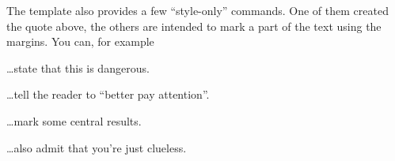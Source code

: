 
The template also provides a few ``style-only'' commands. One of them created the quote above, the others are intended to mark a part of the text using the margins. You can, for example

\bigskip\bigskip
\dots state that this is dangerous.\MDanger

\bigskip\bigskip
\dots tell the reader to ``better pay attention''.\MAttention

\bigskip\bigskip
\dots mark some central results.\MHint

\bigskip\bigskip
\dots also admit that you're just clueless.\MQuestion








